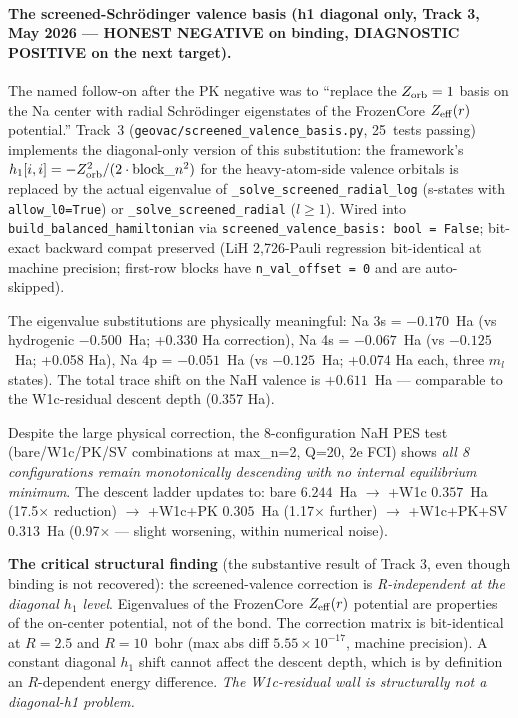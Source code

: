 \documentclass[aps,pra,twocolumn,superscriptaddress,longbibliography]{revtex4-2}
\begin{document}
\paragraph{The screened-Schr\"odinger valence basis (h1 diagonal only,
Track 3, May 2026 --- HONEST NEGATIVE on binding, DIAGNOSTIC POSITIVE
on the next target).}
The named follow-on after the PK negative was to ``replace the
$Z_{\rm orb} = 1$ basis on the Na center with radial Schr\"odinger
eigenstates of the FrozenCore $Z_{\rm eff}(r)$ potential.'' Track~3
(\texttt{geovac/screened\_valence\_basis.py}, 25~tests passing) implements
the diagonal-only version of this substitution: the framework's
$h_1[i,i] = -Z_{\rm orb}^2 / (2 \cdot \text{block}\_n^2)$ for the
heavy-atom-side valence orbitals is replaced by the actual eigenvalue
of \texttt{\_solve\_screened\_radial\_log} (s-states with
\texttt{allow\_l0=True}) or \texttt{\_solve\_screened\_radial}
($l \geq 1$). Wired into \texttt{build\_balanced\_hamiltonian} via
\texttt{screened\_valence\_basis: bool = False}; bit-exact backward
compat preserved (LiH 2{,}726-Pauli regression bit-identical at machine
precision; first-row blocks have \texttt{n\_val\_offset = 0} and are
auto-skipped).

The eigenvalue substitutions are physically meaningful:
Na 3s = $-0.170$~Ha (vs hydrogenic $-0.500$~Ha; +0.330 Ha correction),
Na 4s = $-0.067$~Ha (vs $-0.125$~Ha; +0.058 Ha),
Na 4p = $-0.051$~Ha (vs $-0.125$~Ha; +0.074 Ha each, three $m_l$ states).
The total trace shift on the NaH valence is $+0.611$~Ha --- comparable
to the W1c-residual descent depth (0.357 Ha).

Despite the large physical correction, the 8-configuration NaH PES
test (bare/W1c/PK/SV combinations at max\_n=2, Q=20, 2e FCI)
shows \emph{all 8 configurations remain monotonically descending with
no internal equilibrium minimum}. The descent ladder updates to:
bare $6.244$~Ha $\to$ +W1c $0.357$~Ha (17.5$\times$ reduction) $\to$
+W1c+PK $0.305$~Ha (1.17$\times$ further) $\to$ +W1c+PK+SV $0.313$~Ha
(0.97$\times$ --- slight worsening, within numerical noise).

\textbf{The critical structural finding} (the substantive result of
Track 3, even though binding is not recovered): the screened-valence
correction is \emph{R-independent at the diagonal $h_1$ level}.
Eigenvalues of the FrozenCore $Z_{\rm eff}(r)$ potential are properties
of the on-center potential, not of the bond. The correction matrix
is bit-identical at $R = 2.5$ and $R = 10$~bohr (max abs diff
$5.55 \times 10^{-17}$, machine precision). A constant diagonal
$h_1$ shift cannot affect the descent depth, which is by definition
an $R$-dependent energy difference. \emph{The W1c-residual wall
is structurally not a diagonal-h1 problem.}
\end{document}
